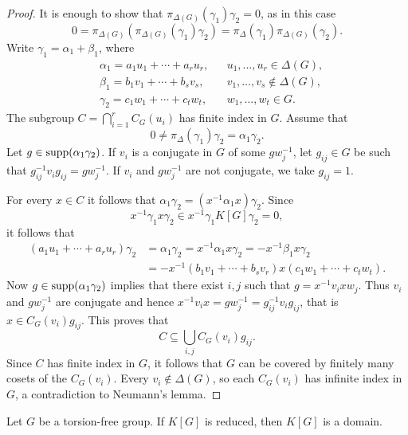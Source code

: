 \begin{proof}
	It is enough to show that $\pi_{\Delta(G)}(\gamma_1)\gamma_2=0$, 
	as in this case
	\[
		0=\pi_{\Delta(G)}(\pi_{\Delta(G)}(\gamma_1)\gamma_2)=\pi_{\Delta}(\gamma_1)\pi_{\Delta(G)}(\gamma_2).
	\]
	Write $\gamma_1=\alpha_1+\beta_1$, where 
	\begin{align*}
		&\alpha_1=a_1u_1+\cdots+a_ru_r, && u_1,\dots,u_r\in\Delta(G),\\
		&\beta_1=b_1v_1+\cdots+b_sv_s, && v_1,\dots,v_s\not\in\Delta(G),\\
		&\gamma_2=c_1w_1+\cdots+c_tw_t,&& w_1,\dots,w_t\in G.
	\end{align*}
	The subgroup $C=\bigcap_{i=1}^rC_G(u_i)$ has finite index in $G$.
	Assume that 
	\[
		0\ne \pi_{\Delta}(\gamma_1)\gamma_2=\alpha_1\gamma_2. 
	\]
	Let $g\in\operatorname{supp}(\alpha_1\gamma_2)$. 
	If $v_i$ is a conjugate in $G$ of some 
	$gw_j^{-1}$, let $g_{ij}\in G$ be such that
	$g_{ij}^{-1}v_ig_{ij}=gw_j^{-1}$. If $v_i$ and $gw_j^{-1}$ 
	are not conjugate, 
	we take $g_{ij}=1$. 

	For every $x\in C$ it follows that
	$\alpha_1\gamma_2=(x^{-1}\alpha_1x)\gamma_2$. Since  
	\[
		x^{-1}\gamma_1x\gamma_2\in x^{-1}\gamma_1K[G]\gamma_2=0,
	\]
	it follows that
	\begin{align*}
		(a_1u_1+\cdots+a_ru_r)\gamma_2&=
		\alpha_1\gamma_2=x^{-1}\alpha_1x\gamma_2=-x^{-1}\beta_1x\gamma_2\\
		&=-x^{-1}(b_1v_1+\cdots+b_sv_r)x(c_1w_1+\cdots+c_tw_t).
	\end{align*}
	Now $g\in\operatorname{supp}(\alpha_1\gamma_2)$ implies that there exist $i,j$ such that
	$g=x^{-1}v_ixw_j$.
	Thus $v_i$ and $gw_j^{-1}$ are conjugate and hence
	$x^{-1}v_ix=gw_j^{-1}=g_{ij}^{-1}v_ig_{ij}$, that is
	$x\in C_G(v_i)g_{ij}$. This proves that 
	\[
		C\subseteq\bigcup_{i,j}C_G(v_i)g_{ij}. 
	\]
	Since $C$ has finite index in $G$, it follows that 
	$G$ can be covered by finitely many cosets of 
	the $C_G(v_i)$. Every $v_i\not\in\Delta(G)$, so 
	each $C_G(v_i)$ has infinite index in $G$, a contradiction 
	to Neumann's lemma.
\end{proof}

\begin{theorem}
	Let $G$ be a torsion-free group. If 
	$K[G]$ is reduced, then $K[G]$ is a domain.
\end{theorem}

